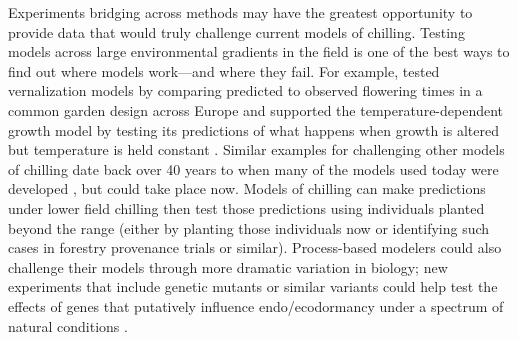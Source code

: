 \documentclass[11pt]{article}
\newcommand{\R}[1]{\label{#1}\linelabel{#1}}
\begin{document}
Experiments bridging across methods may have the greatest opportunity to provide data that would truly challenge current models of chilling. Testing models across large environmental gradients in the field is one of the best ways to find out where models work---and where they fail. For example, \citet[][]{Wilczek:2009oa}\R{r2bad1} tested vernalization models by comparing predicted to observed flowering times in a common garden design across Europe and supported the temperature-dependent growth model by testing its predictions of what happens when growth is altered but temperature is held constant \citep{zhao2020temperature}. Similar examples for challenging other models of chilling date back over 40 years to when many of the models used today were developed \citep{richardson1974,chuine2016,ospreebbms}, but could take place now. Models of chilling can make predictions under lower field chilling then test those predictions using individuals planted beyond the range (either by planting those individuals now or identifying such cases in forestry provenance trials or similar). Process-based modelers could also challenge their models through more dramatic variation in biology; new experiments that include genetic mutants or similar variants \citep[e.g.,][]{azeez2021early,pan2023epigenetic} could help test the effects of genes that putatively influence endo/ecodormancy under a spectrum of natural conditions \citep{Satake2022}. 

\end{document}
